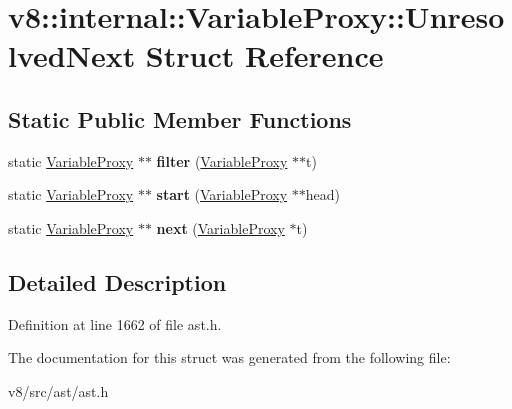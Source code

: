 \hypertarget{structv8_1_1internal_1_1VariableProxy_1_1UnresolvedNext}{}\section{v8\+:\+:internal\+:\+:Variable\+Proxy\+:\+:Unresolved\+Next Struct Reference}
\label{structv8_1_1internal_1_1VariableProxy_1_1UnresolvedNext}
\subsection*{Static Public Member Functions}
\begin{DoxyCompactItemize}
\item 
\mbox{\label{structv8_1_1internal_1_1VariableProxy_1_1UnresolvedNext_a04760a07093c90e9b2cbb8fa1f76393d}} 
static \mbox{\hyperlink{classv8_1_1internal_1_1VariableProxy}{Variable\+Proxy}} $\ast$$\ast$ {\bfseries filter} (\mbox{\hyperlink{classv8_1_1internal_1_1VariableProxy}{Variable\+Proxy}} $\ast$$\ast$t)
\item 
\mbox{\label{structv8_1_1internal_1_1VariableProxy_1_1UnresolvedNext_aca8352f05e31e10a3826c6858cd9e774}} 
static \mbox{\hyperlink{classv8_1_1internal_1_1VariableProxy}{Variable\+Proxy}} $\ast$$\ast$ {\bfseries start} (\mbox{\hyperlink{classv8_1_1internal_1_1VariableProxy}{Variable\+Proxy}} $\ast$$\ast$head)
\item 
\mbox{\label{structv8_1_1internal_1_1VariableProxy_1_1UnresolvedNext_a46530e3f0420e0a35874866dd0f75009}} 
static \mbox{\hyperlink{classv8_1_1internal_1_1VariableProxy}{Variable\+Proxy}} $\ast$$\ast$ {\bfseries next} (\mbox{\hyperlink{classv8_1_1internal_1_1VariableProxy}{Variable\+Proxy}} $\ast$t)
\end{DoxyCompactItemize}


\subsection{Detailed Description}


Definition at line 1662 of file ast.\+h.



The documentation for this struct was generated from the following file\+:\begin{DoxyCompactItemize}
\item 
v8/src/ast/ast.\+h\end{DoxyCompactItemize}
